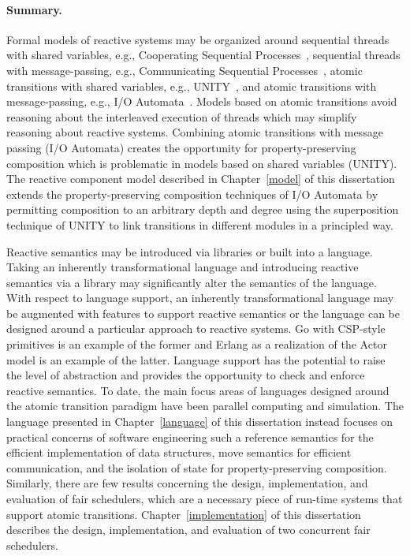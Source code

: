 \paragraph{Summary.}
Formal models of reactive systems may be organized around sequential threads with shared variables, e.g., Cooperating Sequential Processes~\cite{dijkstra1965cooperating}, sequential threads with message-passing, e.g., Communicating Sequential Processes~\cite{hoare1978communicating}, atomic transitions with shared variables, e.g., UNITY~\cite{chandy1989parallel}, and atomic transitions with message-passing, e.g., I/O Automata~\cite{nancy1996distributed}.
Models based on atomic transitions avoid reasoning about the interleaved execution of threads which may simplify reasoning about reactive systems.
Combining atomic transitions with message passing (I/O Automata) creates the opportunity for property-preserving composition which is problematic in models based on shared variables (UNITY).
The reactive component model described in Chapter~\ref{model} of this dissertation extends the property-preserving composition techniques of I/O Automata by permitting composition to an arbitrary depth and degree using the superposition technique of UNITY to link transitions in different modules in a principled way.

Reactive semantics may be introduced via libraries or built into a language.
Taking an inherently transformational language and introducing reactive semantics via a library may significantly alter the semantics of the language.
With respect to language support, an inherently transformational language may be augmented with features to support reactive semantics or the language can be designed around a particular approach to reactive systems.
Go with CSP-style primitives is an example of the former and Erlang as a realization of the Actor model is an example of the latter.
Language support has the potential to raise the level of abstraction and provides the opportunity to check and enforce reactive semantics.
To date, the main focus areas of languages designed around the atomic transition paradigm have been parallel computing and simulation.
The \rcgo{} language presented in Chapter~\ref{language} of this dissertation instead focuses on practical concerns of software engineering such a reference semantics for the efficient implementation of data structures, move semantics for efficient communication, and the isolation of state for property-preserving composition.
Similarly, there are few results concerning the design, implementation, and evaluation of fair schedulers, which are a necessary piece of run-time systems that support atomic transitions.
Chapter~\ref{implementation} of this dissertation describes the design, implementation, and evaluation of two concurrent fair schedulers.

